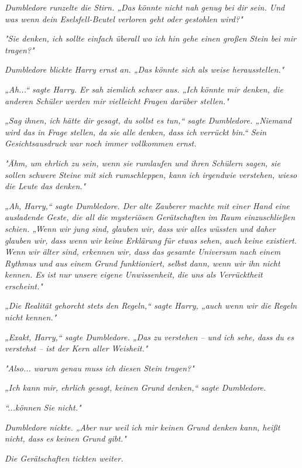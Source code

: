 {\emph{Dumbledore runzelte die Stirn. „Das könnte nicht nah genug bei dir sein. Und was wenn dein Eselsfell-Beutel verloren geht oder gestohlen wird?"}

\emph{"Sie denken, ich sollte einfach überall wo ich hin gehe einen großen Stein bei mir tragen?"}

\emph{Dumbledore blickte Harry ernst an. „Das könnte sich als weise herausstellen."}

\emph{„Ah...“ sagte Harry. Er sah ziemlich schwer aus. „Ich könnte mir denken, die anderen Schüler werden mir vielleicht Fragen darüber stellen."}

\emph{„Sag ihnen, ich hätte dir gesagt, du sollst es tun,“ sagte Dumbledore. „Niemand wird das in Frage stellen, da sie alle denken, dass ich verrückt bin.“ Sein Gesichtsausdruck war noch immer vollkommen ernst.}

\emph{"Ähm, um ehrlich zu sein, wenn sie rumlaufen und ihren Schülern sagen, sie sollen schwere Steine mit sich rumschleppen, kann ich irgendwie verstehen, wieso die Leute das denken."}

\emph{„Ah, Harry,“ sagte Dumbledore. Der alte Zauberer machte mit einer Hand eine ausladende Geste, die all die mysteriösen Gerätschaften im Raum einzuschließen schien. „Wenn wir jung sind, glauben wir, dass wir alles wüssten und daher glauben wir, dass wenn wir keine Erklärung für etwas sehen, auch keine existiert. Wenn wir älter sind, erkennen wir, dass das gesamte Universum nach einem Rythmus und aus einem Grund funktioniert, selbst dann, wenn wir ihn nicht kennen. Es ist nur unsere eigene Unwissenheit, die uns als Verrücktheit erscheint."}

\emph{„Die Realität gehorcht stets den Regeln,“ sagte Harry, „auch wenn wir die} \emph{Regeln nicht kennen."}

\emph{„Exakt, Harry,“ sagte Dumbledore. „Das zu verstehen -- und ich sehe,} \emph{\emph{dass}} \emph{du es verstehst -- ist der Kern aller Weisheit."}

\emph{"Also...} \emph{\emph{warum}} \emph{genau muss ich diesen Stein tragen?"}

\emph{„Ich kann mir, ehrlich gesagt, keinen Grund denken,“ sagte Dumbledore.}

\emph{“...können Sie nicht."}

\emph{Dumbledore nickte. „Aber nur weil ich mir keinen Grund denken kann, heißt nicht, dass es keinen Grund} \emph{\emph{gibt.}"}

\emph{Die Gerätschaften tickten weiter.}

}
